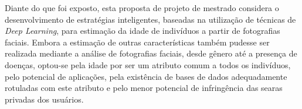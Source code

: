 Diante do que foi exposto, esta proposta de projeto de mestrado considera o desenvolvimento de estratégias inteligentes, baseadas na utilização de técnicas de \emph{Deep Learning}, para estimação da idade de indivíduos a partir de fotografias faciais. Embora a estimação de outras características também pudesse ser realizada mediante a análise de fotografias faciais, desde gênero até a presença de doenças, optou-se pela idade por ser um atributo comum a todos os indivíduos, pelo potencial de aplicações, pela existência de bases de dados adequadamente rotuladas com este atributo e pelo menor potencial de infringência das searas privadas dos usuários.
